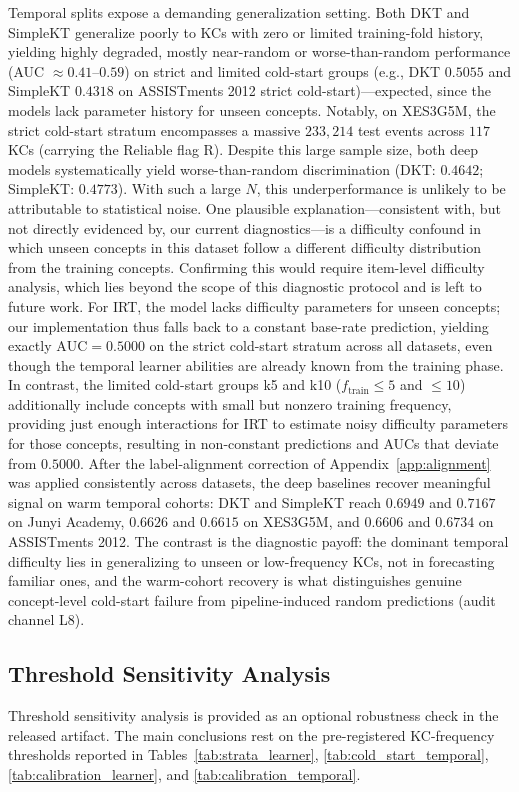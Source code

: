Temporal splits expose a demanding generalization setting. Both DKT and SimpleKT generalize poorly to KCs with zero or limited training-fold history, yielding highly degraded, mostly near-random or worse-than-random performance (AUC $\approx 0.41$--$0.59$) on strict and limited cold-start groups (e.g., DKT $0.5055$ and SimpleKT $0.4318$ on ASSISTments 2012 strict cold-start)---expected, since the models lack parameter history for unseen concepts. Notably, on XES3G5M, the strict cold-start stratum encompasses a massive $233,214$ test events across $117$ KCs (carrying the Reliable flag R). Despite this large sample size, both deep models systematically yield worse-than-random discrimination (DKT: $0.4642$; SimpleKT: $0.4773$). With such a large $N$, this underperformance is unlikely to be attributable to statistical noise. One plausible explanation---consistent with, but not directly evidenced by, our current diagnostics---is a difficulty confound in which unseen concepts in this dataset follow a different difficulty distribution from the training concepts. Confirming this would require item-level difficulty analysis, which lies beyond the scope of this diagnostic protocol and is left to future work. For IRT, the model lacks difficulty parameters for unseen concepts; our implementation thus falls back to a constant base-rate prediction, yielding exactly $\text{AUC} = 0.5000$ on the strict cold-start stratum across all datasets, even though the temporal learner abilities are already known from the training phase. In contrast, the limited cold-start groups k5 and k10 ($f_{\mathrm{train}} \le 5$ and $\le 10$) additionally include concepts with small but nonzero training frequency, providing just enough interactions for IRT to estimate noisy difficulty parameters for those concepts, resulting in non-constant predictions and AUCs that deviate from $0.5000$. After the label-alignment correction of Appendix~\ref{app:alignment} was applied consistently across datasets, the deep baselines recover meaningful signal on warm temporal cohorts: DKT and SimpleKT reach $0.6949$ and $0.7167$ on Junyi Academy, $0.6626$ and $0.6615$ on XES3G5M, and $0.6606$ and $0.6734$ on ASSISTments 2012. The contrast is the diagnostic payoff: the dominant temporal difficulty lies in generalizing to unseen or low-frequency KCs, not in forecasting familiar ones, and the warm-cohort recovery is what distinguishes genuine concept-level cold-start failure from pipeline-induced random predictions (audit channel L8).

\subsection{Threshold Sensitivity Analysis}
Threshold sensitivity analysis is provided as an optional robustness check in the released artifact. The main conclusions rest on the pre-registered KC-frequency thresholds reported in Tables~\ref{tab:strata_learner}, \ref{tab:cold_start_temporal}, \ref{tab:calibration_learner}, and \ref{tab:calibration_temporal}.
